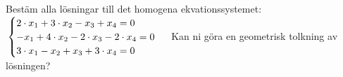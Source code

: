 Bestäm alla lösningar till det homogena ekvationssystemet:
\begin{math}
	\\
	\begin{cases}
	2 \cdot x_1 + 3 \cdot x_2  - x_3 + x_4 = 0 \\
	-x_1 + 4 \cdot x_2 -2 \cdot x_3 -2 \cdot x_4 = 0 \\
	3 \cdot x_1 - x_2  + x_3 + 3 \cdot x_4 = 0 \\
	\end{cases}
	\\
	\\
\end{math}
Kan ni göra en geometrisk tolkning av lösningen?